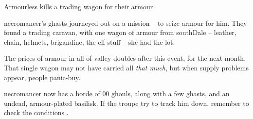 \boxPair[t]{
  \thenecromancer
}{
  \showStdSpells
}

\newcommand\deadProgressChart{
  \begin{nametable}{Dead Tactics}

    \textbf{Round} & \textbf{Event} \\\hline

    1 & 200 ghouls assault the gate. \\

    2 & 4 ghasts each attack a quarter of the \gls{village} each (one attempts to open the gate). \\

    3 & \Gls{necromancer} casts offensive spells on anyone at the gate. \\

    4 & The ghouls have formed a pyramid at the gate. \\

    5 & 5 ghouls climb over the gate. \\

    6 & 10 more ghouls climb over the gate. \\

    7 & 15 more ghouls climb over the gate. \\

    8 & Resolve the roll. \\

  \end{nametable}
  \label{necroTactics}
}

{Armourless}%
{ kills a trading wagon for their armour}%
\label{necroArmour}

\begin{exampletext}
  \Gls{necromancer}'s ghasts journeyed out on a mission -- to seize armour for him.
  They found a trading caravan, with one wagon of armour from \gls{southDale} -- leather, chain, helmets, brigandine, the elf-stuff -- she had the lot.
\end{exampletext}

The prices of armour in all of \gls{valley} doubles after this event, for the next month.
That single wagon may not have carried all \emph{that much}, but when supply problems appear, people panic-buy.

\Gls{necromancer} now has a horde of 00 ghouls, along with a few ghasts, and an undead, armour-plated \gls{basilisk}.
If the troupe try to track him down, remember to check the conditions .

